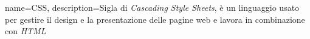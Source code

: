 {
	name={CSS},
	description={Sigla di \textit{Cascading Style Sheets}, è un linguaggio usato per gestire il design e la presentazione delle pagine web e lavora in combinazione con \textit{HTML}}
}